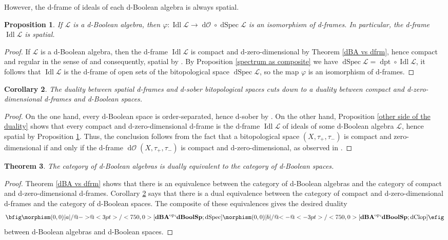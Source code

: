 \documentclass[11pt]{article}
\DeclareMathOperator{\idl}{Idl}
\DeclareMathOperator{\dSpec}{dSpec}
\DeclareMathOperator{\dClop}{dClop}
\DeclareMathOperator{\dO}{d\mathcal{O}}
\DeclareMathOperator{\dpt}{dpt}
\theoremstyle{plain}
\newtheorem{thm}{Theorem}[section]
\newtheorem{prop}[thm]{Proposition}
\newtheorem{cor}[thm]{Corollary}
\theoremstyle{definition}
\newcommand{\lra}{\longrightarrow}
\begin{document}
However, the d-frame  of ideals of each d-Boolean algebra is always spatial.
\begin{prop}\label{compact and zero-dimensional d-frame is spatial} 
If $\mathcal{L}$ is a d-Boolean algebra, then  $\varphi\colon\idl\mathcal{L}\lra \dO\circ\dSpec\mathcal{L}$ is an isomorphism of d-frames. In particular, the d-frame $\idl\mathcal{L}$ is spatial. 
\end{prop}

\begin{proof} If  $\mathcal{L}$ is a d-Boolean algebra, then the d-frame $\idl\mathcal{L}$ is compact and d-zero-dimensional by Theorem \ref{dBA vs dfrm},
hence compact and regular in the sense of  \cite[Section 6]{JM2006} and consequently,   spatial by  \cite[Theorem 6.11]{JM2006}. By Proposition \ref{spectrum as composite} we have $\dSpec\mathcal{L} = \dpt\circ\idl\mathcal{L}$, it follows that $\idl\mathcal{L}$ is the d-frame of open sets of the bitopological space $\dSpec\mathcal{L}$,  so the map $\varphi$ is an isomorphism of d-frames.  \end{proof}  
 
\begin{cor} \label{duality between zk dframes and zk spaces}
The duality between spatial d-frames and d-sober bitopological spaces cuts down to a duality between compact and d-zero-dimensional d-frames and d-Boolean spaces.
\end{cor}

\begin{proof} On the one hand, every d-Boolean space is order-separated, hence d-sober by \cite[Theorem 3.9]{JM2008}. On the other hand, Proposition \ref{other side of the duality} shows that every compact and d-zero-dimensional d-frame is the d-frame $\idl\mathcal{L}$ of ideals of some d-Boolean algebra $\mathcal{L}$, hence  spatial by  Proposition \ref{compact and zero-dimensional d-frame is spatial}.  Thus, the conclusion follows from the fact that a bitopological space $(X,\tau_+,\tau_-)$ is compact and zero-dimensional if and only if   the d-frame  $\dO(X, \tau_+, \tau_-)$ is compact and d-zero-dimensional, as observed in \cite[Section 2.3]{Jakl}. \end{proof}
 
\begin{thm} \label{duality of Stone bitop}
The category of d-Boolean algebras is dually equivalent to the category of d-Boolean spaces.
\end{thm}

\begin{proof} Theorem \ref{dBA vs dfrm} shows that there is an equivalence  between the category of d-Boolean algebras and the category of compact and d-zero-dimensional d-frames. Corollary  \ref{duality between zk dframes and zk spaces} says that there is a dual equivalence  between the category of compact and d-zero-dimensional d-frames and the category of d-Boolean spaces. The composite of these equivalences gives the desired duality  $$\bfig
\morphism(0,0)|a|/@{->}@<3pt>/<750,0>[{\bf dBA}^{\rm op}`{\bf dBoolSp};\dSpec ]
\morphism(0,0)|b|/@{<-}@<-3pt>/<750,0>[{\bf dBA}^{\rm op}`{\bf dBoolSp}; \dClop] \efig$$ between d-Boolean algebras and d-Boolean spaces. \end{proof}
 
\end{document}
